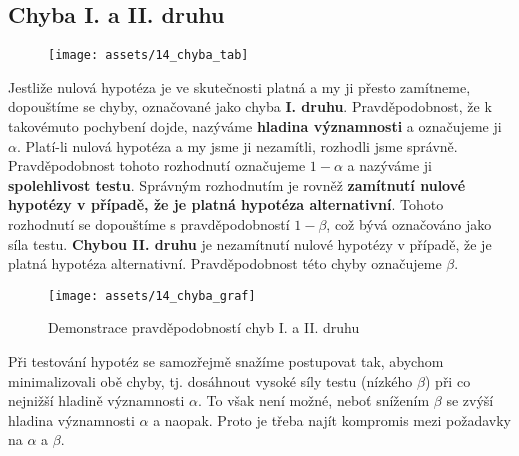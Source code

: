 \subsection{Chyba I. a II. druhu}
\begin{figure}[H]
    \centering
    \texttt{[image: assets/14\_chyba\_tab]}
\end{figure}
Jestliže nulová hypotéza je ve skutečnosti platná a my ji přesto zamítneme, dopouštíme se chyby, označované jako chyba \textbf{I. druhu}. Pravděpodobnost, že k takovémuto pochybení dojde, nazýváme \textbf{hladina významnosti} a označujeme ji $\alpha$. Platí-li nulová hypotéza a my jsme ji nezamítli, rozhodli jsme správně. Pravděpodobnost tohoto rozhodnutí označujeme $1 − \alpha$ a nazýváme ji \textbf{spolehlivost testu}. Správným rozhodnutím je rovněž \textbf{zamítnutí nulové hypotézy v případě, že je platná hypotéza alternativní}. Tohoto rozhodnutí se dopouštíme s pravděpodobností $1 − \beta$, což bývá označováno jako síla testu. \textbf{Chybou II. druhu} je nezamítnutí nulové hypotézy v případě, že je platná hypotéza alternativní. Pravděpodobnost této chyby označujeme $\beta$.
\begin{figure}[H]
    \centering
    \texttt{[image: assets/14\_chyba\_graf]}
    \caption{Demonstrace pravděpodobností chyb I. a II. druhu}
\end{figure}
Při testování hypotéz se samozřejmě snažíme postupovat tak, abychom minimalizovali obě chyby, tj. dosáhnout vysoké síly testu (nízkého $\beta$) při co nejnižší hladině významnosti $\alpha$. To však není možné, neboť snížením $\beta$ se zvýší hladina významnosti $\alpha$ a naopak. Proto je třeba najít kompromis mezi požadavky na $\alpha$ a $\beta$.


